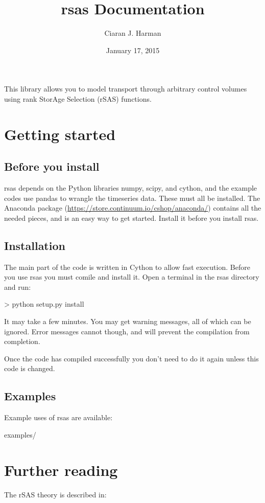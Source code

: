 \documentclass[letterpaper,10pt,english]{sphinxmanual}
\title{rsas Documentation}
\date{January 17, 2015}
\author{Ciaran J. Harman}
\begin{document}
\maketitle
\tableofcontents
{}\label{index::doc}


This library allows you to model transport through arbitrary control volumes using
rank StorAge Selection (rSAS) functions.


\chapter{Getting started}
\label{index:getting-started}\label{index:documentation-of-the-rsas-library}

\section{Before you install}
\label{index:before-you-install}
rsas depends on the Python libraries numpy, scipy, and cython, and the example
codes use pandas to wrangle the timeseries data. These must all be installed.
The Anaconda package (\href{https://store.continuum.io/cshop/anaconda/}{https://store.continuum.io/cshop/anaconda/}) contains all
the needed pieces, and is an easy way to get started. Install it before you
install rsas.


\section{Installation}
\label{index:installation}
The main part of the code is written in Cython to allow fast execution. Before
you use rsas you must comile and install it. Open a terminal in the rsas directory
and run:

\textgreater{} python setup.py install

It may take a few minutes. You may get warning messages, all of which can be ignored.
Error messages cannot though, and will prevent the compilation from completion.

Once the code has compiled successfully you don't need to do it again
unless this code is changed.


\section{Examples}
\label{index:examples}
Example uses of rsas are available:

examples/


\chapter{Further reading}
\label{index:further-reading}
The rSAS theory is described in:
\end{document}
